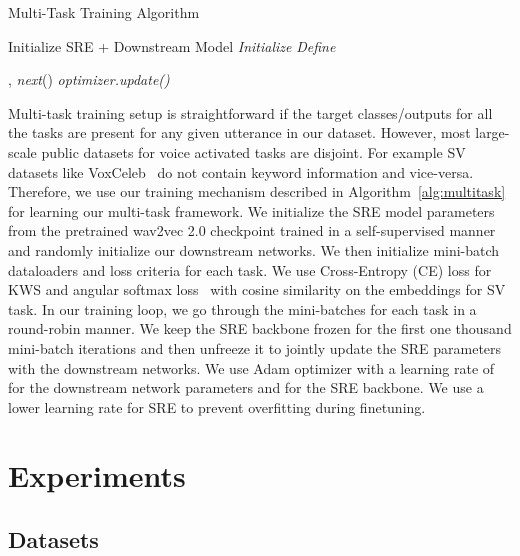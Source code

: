 \documentclass{article}
\begin{document}
\begin{algorithm}
   \caption{Multi-Task Training Algorithm}
   \label{alg:multitask}

\begin{algorithmic}
    \STATE   Initialize SRE + Downstream Model 
        \STATE   
        \STATE \textit{Initialize} 
        \STATE \textit{Define} 
    \ENDFOR
    
    
            \STATE ,   \textit{next}()
            \STATE   
            \STATE 
            \STATE 
            \STATE \textit{\textit{\textit{optimizer}.\textit{update}()}}
        \ENDFOR
    \ENDFOR
   
\end{algorithmic}
\end{algorithm}

Multi-task training setup is straightforward if the target classes/outputs for all the tasks are present for any given utterance in our dataset.
However, most large-scale public datasets for voice activated tasks are disjoint. For example SV datasets like VoxCeleb~\cite{nagrani2017voxceleb} do not contain keyword information and vice-versa. Therefore, we use our training mechanism described in Algorithm~\ref{alg:multitask} for learning our multi-task framework. We initialize the SRE model parameters from the pretrained wav2vec 2.0 checkpoint trained in a self-supervised manner and randomly initialize our downstream networks.
We then initialize mini-batch dataloaders and loss criteria for each task. We use Cross-Entropy (CE) loss for KWS and angular softmax loss~\cite{Liu_2017_CVPR} with cosine similarity on the embeddings for SV task. 
In our training loop, we go through the mini-batches for each task in a round-robin manner. We keep the SRE backbone frozen for the first one thousand mini-batch iterations and then unfreeze it to jointly update the SRE parameters with the downstream networks. We use Adam optimizer with a learning rate of  for the downstream network parameters and  for the SRE backbone. We use a lower learning rate for SRE to prevent overfitting during finetuning. 

\section{Experiments}
\subsection{Datasets}
\end{document}
